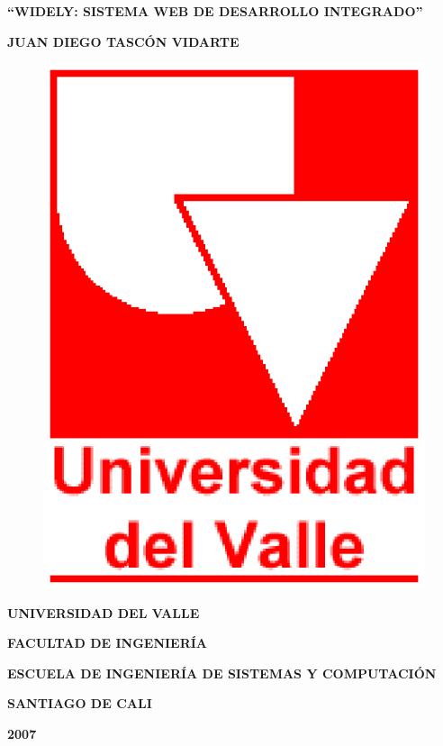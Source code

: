 
\begin{center} \textbf{\newline\newline} \end{center}
\begin{center} \textbf{``WIDELY: SISTEMA WEB DE DESARROLLO INTEGRADO''} \end{center}

\vspace{10em}

\begin{center} \textbf{JUAN DIEGO TASCÓN VIDARTE} \end{center}

\vspace{10em}


\begin{figure}[h]
	\centering
	\includegraphics[scale=0.3]{./img/uvlogo}
	\label{img:uvlogo-p1}
\end{figure}

\begin{center} \textbf{UNIVERSIDAD DEL VALLE} \end{center}
\begin{center} \textbf{FACULTAD DE INGENIERÍA} \end{center}
\begin{center} \textbf{ESCUELA DE INGENIERÍA DE SISTEMAS Y COMPUTACIÓN} \end{center}
\begin{center} \textbf{SANTIAGO DE CALI} \end{center}
\begin{center} \textbf{2007} \end{center}


